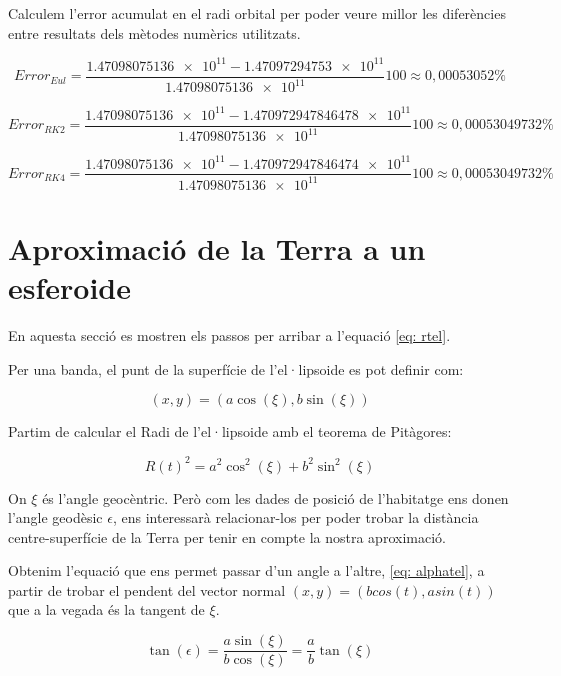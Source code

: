 \documentclass[11pt]{article}
\begin{document}
Calculem l'error acumulat en el radi orbital per poder veure millor les diferències entre resultats dels mètodes numèrics utilitzats.

\begin{equation}
    Error_{Eul} = \frac{\num{1.47098075136e11}-\num{1.47097294753e11}}{\num{1.47098075136e11}}100\approx0,00053052\%
\end{equation}

\begin{equation}
    Error_{RK2} = \frac{\num{1.47098075136e11}-\num{1.470972947846478e11}}{\num{1.47098075136e11}}100\approx0,00053049732\%
\end{equation}

\begin{equation}
    Error_{RK4} = \frac{\num{1.47098075136e11}-\num{1.470972947846474e11}}{\num{1.47098075136e11}}100\approx0,00053049732\%
\end{equation}

\section{Aproximació de la Terra a un esferoide}
\label{sec: terraesferoidedibuix}
En aquesta secció es mostren els passos per arribar a l'equació \eqref{eq: rtel}.

Per una banda, el punt de la superfície de l'el·lipsoide es pot definir com:

\begin{equation}
    (x,y) = (a\cos(\xi),b\sin(\xi))
\end{equation}

Partim de calcular el Radi de l'el·lipsoide amb el teorema de Pitàgores:

\begin{equation}
    R(t)^2 = a^2\cos^2(\xi) + b^2\sin^2(\xi)
    \label{eq: Pitagoreselipsoide}
\end{equation}

On $\xi$ és l'angle geocèntric. Però com les dades de posició de l'habitatge ens donen l'angle geodèsic $\epsilon$, ens interessarà relacionar-los per poder trobar la distància centre-superfície de la Terra per tenir en compte la nostra aproximació.

Obtenim l'equació que ens permet passar d'un angle a l'altre, \eqref{eq: alphatel}, a partir de trobar el pendent del vector normal $(x,y) = (bcos(t), asin(t))$ que a la vegada és la tangent de $\xi$.

\begin{equation}
    \tan(\epsilon) = \frac{a\sin(\xi)}{b\cos(\xi)} = \frac{a}{b}\tan(\xi)
\end{equation}
\end{document}
